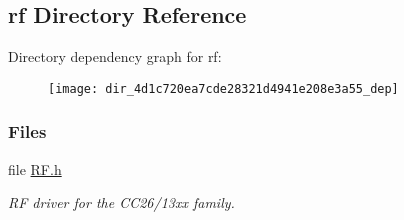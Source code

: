\subsection{rf Directory Reference}
\label{dir_4d1c720ea7cde28321d4941e208e3a55}
Directory dependency graph for rf\+:
\nopagebreak
\begin{figure}[H]
\begin{center}
\leavevmode
\texttt{[image: dir\_4d1c720ea7cde28321d4941e208e3a55\_dep]}
\end{center}
\end{figure}
\subsubsection*{Files}
\begin{DoxyCompactItemize}
\item 
file \hyperlink{_r_f_8h}{R\+F.\+h}
\begin{DoxyCompactList}\small\item\em R\+F driver for the C\+C26/13xx family. \end{DoxyCompactList}\end{DoxyCompactItemize}
